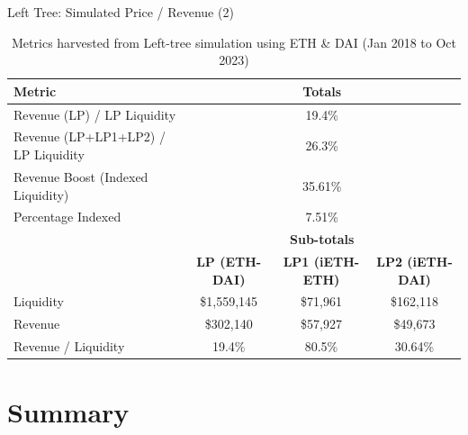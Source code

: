 \documentclass[10pt,xcolor=svgnames]{beamer} %
\begin{document}
\begin{frame}{Left Tree: Simulated Price / Revenue (2)}


\begin{table}[h]
\tiny
\centering
\begin{tabular}{ |l|c|c|c| } 
\hline
 \textbf{Metric} & \multicolumn{3}{|c|}{\textbf{Totals}}\\
\hline 
 Revenue (LP) / LP Liquidity & \multicolumn{3}{|c|}{19.4\% }\\
 Revenue (LP+LP1+LP2) / LP Liquidity & \multicolumn{3}{|c|}{26.3\% }\\
 Revenue Boost (Indexed Liquidity)  & \multicolumn{3}{|c|}{35.61\%}\\ 
 Percentage Indexed & \multicolumn{3}{|c|}{7.51\%}\\ 
 \hline
\hline
	& \multicolumn{3}{|c|}{\textbf{Sub-totals}} \\
  & \textbf{LP (ETH-DAI)} & \textbf{LP1 (iETH-ETH)} & \textbf{LP2 (iETH-DAI)} \\
\hline
Liquidity  & \$1,559,145 & \$71,961 & \$162,118\\
Revenue  & \$302,140 & \$57,927 & \$49,673\\
Revenue / Liquidity  & 19.4\% & 80.5\% & 30.64\%\\ 
\hline
\end{tabular}
\caption{Metrics harvested from Left-tree simulation using ETH \& DAI (Jan 2018 to Oct 2023)}
\label{table:simulator_components}
\end{table}

\end{frame}



\section{Summary}
\end{document}
